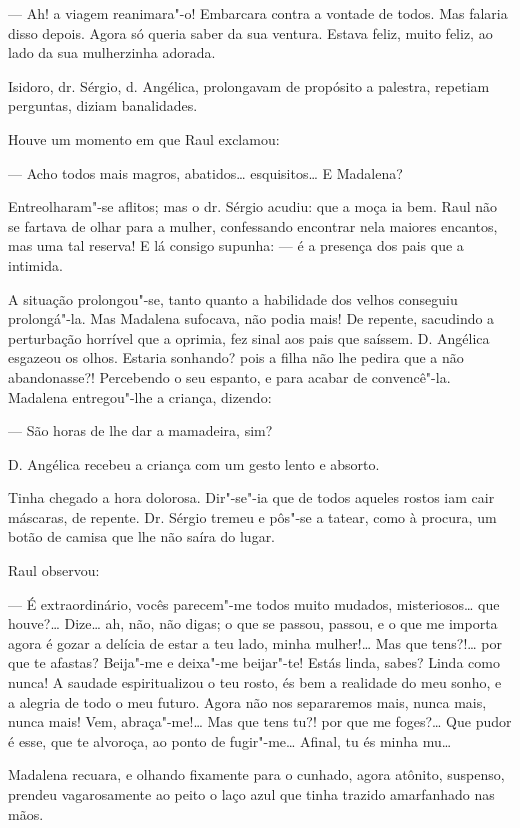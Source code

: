 --- Ah! a viagem reanimara"-o! Embarcara contra a vontade de todos. Mas
falaria disso depois. Agora só queria saber da sua ventura. Estava
feliz, muito feliz, ao lado da sua mulherzinha adorada.

Isidoro, dr. Sérgio, d. Angélica, prolongavam de propósito a palestra,
repetiam perguntas, diziam banalidades.

Houve um momento em que Raul exclamou:

--- Acho todos mais magros, abatidos\ldots{} esquisitos\ldots{} E Madalena?

Entreolharam"-se aflitos; mas o dr. Sérgio acudiu: que a moça ia bem.
Raul não se fartava de olhar para a mulher, confessando encontrar nela
maiores encantos, mas uma tal reserva! E lá consigo supunha: --- é a
presença dos pais que a intimida.

A situação prolongou"-se, tanto quanto a habilidade dos velhos conseguiu
prolongá"-la. Mas Madalena sufocava, não podia mais! De repente,
sacudindo a perturbação horrível que a oprimia, fez sinal aos pais que
saíssem. D. Angélica esgazeou os olhos. Estaria sonhando? pois a filha
não lhe pedira que a não abandonasse?! Percebendo o seu espanto, e para
acabar de convencê"-la. Madalena entregou"-lhe a criança, dizendo:

--- São horas de lhe dar a mamadeira, sim?

D. Angélica recebeu a criança com um gesto lento e absorto.

Tinha chegado a hora dolorosa. Dir"-se"-ia que de todos aqueles rostos iam
cair máscaras, de repente. Dr. Sérgio tremeu e pôs"-se a tatear, como à
procura, um botão de camisa que lhe não saíra do lugar.

Raul observou:

--- É extraordinário, vocês parecem"-me todos muito mudados,
misteriosos\ldots{} que houve?\ldots{} Dize\ldots{} ah, não, não digas; o que se
passou, passou, e o que me importa agora é gozar a delícia de estar a
teu lado, minha mulher!\ldots{} Mas que tens?!\ldots{} por que te afastas?
Beija"-me e deixa"-me beijar"-te! Estás linda, sabes? Linda como nunca! A
saudade espiritualizou o teu rosto, és bem a realidade do meu sonho, e a
alegria de todo o meu futuro. Agora não nos separaremos mais, nunca
mais, nunca mais! Vem, abraça"-me!\ldots{} Mas que tens tu?! por que me
foges?\ldots{} Que pudor é esse, que te alvoroça, ao ponto de fugir"-me\ldots{}
Afinal, tu és minha mu\ldots{}

Madalena recuara, e olhando fixamente para o cunhado, agora atônito,
suspenso, prendeu vagarosamente ao peito o laço azul que tinha trazido
amarfanhado nas mãos.


